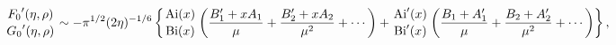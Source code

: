 \[{\mathop{F_{0}\/}\nolimits'\!\left(\eta,\rho\right)\atop\mathop{G_{0}\/}%
\nolimits'\!\left(\eta,\rho\right)}\sim-\pi^{1/2}(2\eta)^{-1/6}\left\{{\mathop%
{\mathrm{Ai}\/}\nolimits\!\left(x\right)\atop\mathop{\mathrm{Bi}\/}\nolimits\!%
\left(x\right)}\left(\frac{B_{1}^{\prime}+xA_{1}}{\mu}+\frac{B_{2}^{\prime}+xA%
_{2}}{\mu^{2}}+\cdots\right)+{\mathop{\mathrm{Ai}\/}\nolimits'\!\left(x\right)%
\atop\mathop{\mathrm{Bi}\/}\nolimits'\!\left(x\right)}\left(\frac{B_{1}+A_{1}^%
{\prime}}{\mu}+\frac{B_{2}+A_{2}^{\prime}}{\mu^{2}}+\cdots\right)\right\},\]